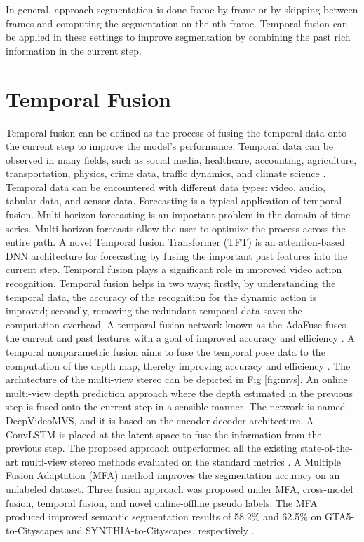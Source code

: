 	In general, approach segmentation is done frame by frame or by skipping between frames and computing the segmentation on the nth frame. Temporal fusion can be applied in these settings to improve segmentation by combining the past rich information in the current step. 
     
    \section{Temporal Fusion}
    \label{sec:tempfuse}
    
	Temporal fusion can be defined as the process of fusing the temporal data onto the current step to improve the model's performance. Temporal data can be observed in many fields, such as social media, healthcare, accounting, agriculture, transportation, physics, crime data, traffic dynamics, and climate science \cite{49_atluri2018spatio}. Temporal data can be encountered with different data types: video, audio, tabular data, and sensor data. Forecasting is a typical application of temporal fusion. Multi-horizon forecasting is an important problem in the domain of time series. Multi-horizon forecasts allow the user to optimize the process across the entire path. A novel Temporal fusion Transformer (TFT) \cite{50_lim2021temporal} is an attention-based DNN architecture for forecasting by fusing the important past features into the current step. Temporal fusion plays a significant role in improved video action recognition. Temporal fusion helps in two ways; firstly, by understanding the temporal data, the accuracy of the recognition for the dynamic action is improved; secondly, removing the redundant temporal data saves the computation overhead. A temporal fusion network known as the AdaFuse fuses the current and past features with a goal of improved accuracy and efficiency \cite{51_meng2021adafuse}. A temporal nonparametric fusion aims to fuse the temporal pose data to the computation of the depth map, thereby improving accuracy and efficiency \cite{52_hou2019multi}. The architecture of the multi-view stereo can be depicted in Fig \ref{fig:mvs}. An online multi-view depth prediction approach where the depth estimated in the previous step is fused onto the current step in a sensible manner. The network is named DeepVideoMVS, and it is based on the encoder-decoder architecture. A ConvLSTM is placed at the latent space to fuse the information from the previous step. The proposed approach outperformed all the existing state-of-the-art multi-view stereo methods evaluated on the standard metrics \cite{53_duzceker2021deepvideomvs}. 
	A Multiple Fusion Adaptation (MFA) method improves the segmentation accuracy on an unlabeled dataset. Three fusion approach was proposed under MFA, cross-model fusion, temporal fusion, and novel online-offline pseudo labels. The MFA produced improved semantic segmentation results of 58.2\% and 62.5\% on GTA5-to-Cityscapes and SYNTHIA-to-Cityscapes, respectively \cite{54_zhang2021multiple}.  
    
